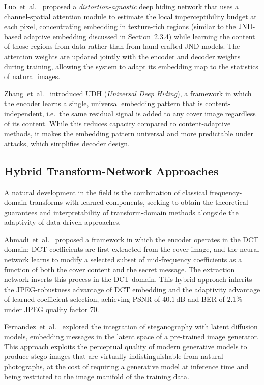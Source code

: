 \documentclass[12pt,a4paper,oneside]{report}
\begin{document}
	Luo~et~al.\ \cite{luo2020distortion} proposed a \emph{distortion-agnostic} deep hiding network
	that uses a channel-spatial attention module to estimate the local imperceptibility budget at each
	pixel, concentrating embedding in texture-rich regions (similar to the JND-based adaptive
	embedding discussed in Section~2.3.4) while learning the content of those regions from data
	rather than from hand-crafted JND models. The attention weights are updated jointly with the
	encoder and decoder weights during training, allowing the system to adapt its embedding map
	to the statistics of natural images.
	
	Zhang~et~al.\ \cite{zhang2020udh} introduced UDH (\textit{Universal Deep Hiding}), a framework
	in which the encoder learns a single, universal embedding pattern that is content-independent,
	i.e.\ the same residual signal is added to any cover image regardless of its content. While
	this reduces capacity compared to content-adaptive methods, it makes the embedding pattern
	universal and more predictable under attacks, which simplifies decoder design.
	
	\subsection{Hybrid Transform-Network Approaches}
	\label{subsec:hybrid}
	
	A natural development in the field is the combination of classical frequency-domain transforms
	with learned components, seeking to obtain the theoretical guarantees and interpretability of
	transform-domain methods alongside the adaptivity of data-driven approaches.
	
	Ahmadi~et~al.\ \cite{ahmadi2020redmark} proposed a framework in which the encoder operates
	in the DCT domain: DCT coefficients are first extracted from the cover image, and the neural
	network learns to modify a selected subset of mid-frequency coefficients as a function of both
	the cover content and the secret message. The extraction network inverts this process in the
	DCT domain. This hybrid approach inherits the JPEG-robustness advantage of DCT embedding and
	the adaptivity advantage of learned coefficient selection, achieving PSNR of $40.1$\,dB and
	BER of $2.1\%$ under JPEG quality factor 70.
	
	Fernandez~et~al.\ \cite{fernandez2023stable} explored the integration of steganography with
	latent diffusion models, embedding messages in the latent space of a pre-trained image
	generator. This approach exploits the perceptual quality of modern generative models to produce
	stego-images that are virtually indistinguishable from natural photographs, at the cost of
	requiring a generative model at inference time and being restricted to the image manifold of
	the training data.
	
\end{document}
